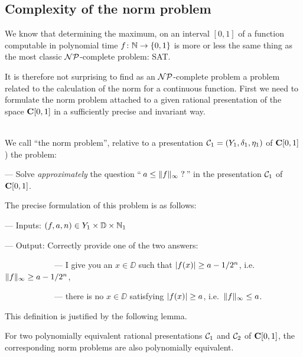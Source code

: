 \subsection{Complexity of the norm problem}\label{subsec43}
We know that determining the maximum, on an interval $[0,1]$ of a function computable in polynomial time $f\colon \mathbb {N} \to \{ 0,1 \}$ is more or less the same thing as the most classic ${\cal NP}$-complete problem: SAT.

It is therefore not surprising to find as an ${\cal NP}$-complete problem a problem related to the calculation of the norm for a continuous function. First we need to formulate the norm problem attached to a given rational presentation of the space ${{\bf C}[0,1]}$ in a sufficiently precise and invariant way. 
 
\begin{definition}\label{431}~\\
We call ``the norm problem'', relative to a presentation ${{\cal C}}_1 = (Y_1, \delta_1, \eta_1)$ of ${{\bf C}[0,1]}$) the problem:

\noindent 
--- Solve \emph{approximately} the question ``$\, a \leq \lVert f \rVert_{\infty}\;?\,$'' in the presentation ${{\cal C}}_1$ of ${{\bf C}[0,1]}$.

\noindent 
The precise formulation of this problem is as follows:

\noindent 
--- Inputs: $(f,a,n) \in Y_1 \times \mathbb {D} \times \mathbb {N}_1$ 

\noindent 
--- Output: Correctly provide one of the two answers:

\noindent 
~~~~~~~~~~~~--- I give you an $x \in \DD$ such that 
$\left|{f(x)}\right| \geq a - 1/2^n$, i.e.\  $\lVert f \rVert_{\infty}\geq a - 1/2^n$,

\noindent 
~~~~~~~~~~~~--- there is no $x \in \DD$ satisfying 
$\left|{f(x)}\right| \geq a$,  i.e.\  $\lVert f \rVert_{\infty}\leq a$.
\end{definition}

This definition is justified by the following lemma.

\begin{lemma} \label{432}
For two polynomially equivalent rational presentations ${{\cal C}}_1$ and ${{\cal C}}_2$ of ${{\bf C}[0,1]}$, the corresponding norm problems are also polynomially equivalent.
\end{lemma}

